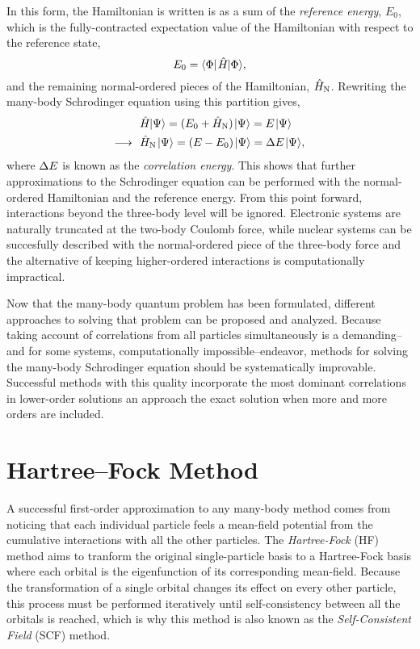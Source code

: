 \documentclass[thesis.tex]{subfiles}
\begin{document}
In this form, the Hamiltonian is written is as a sum of the \textit{reference energy}, $E_{0}$, which is the fully-contracted expectation value of the Hamiltonian with respect to the reference state,
\begin{equation}
  E_{0} = \element{\Phi}{\Ham}{\Phi},
\end{equation}
and the remaining normal-ordered pieces of the Hamiltonian, $\hat{H}_{\mathrm{N}}$.  Rewriting the many-body Schrodinger equation using this partition gives,
\begin{align}
  &\Ham\ket{\Psi} = (E_{0} + \HamN)\ket{\Psi} = E\ket{\Psi} \notag \\
  \longrightarrow\ \ &\HamN\ket{\Psi} = (E - E_{0})\ket{\Psi} = \Ecorr\ket{\Psi},
\end{align}
where $\Delta E$ is known as the \textit{correlation energy}.  This shows that further approximations to the Schrodinger equation can be performed with the normal-ordered Hamiltonian and the reference energy.  From this point forward, interactions beyond the three-body level will be ignored.  Electronic systems are naturally truncated at the two-body Coulomb force, while nuclear systems can be succesfully described with the normal-ordered piece of the three-body force and the alternative of keeping higher-ordered interactions is computationally impractical.

Now that the many-body quantum problem has been formulated, different approaches to solving that problem can be proposed and analyzed.  Because taking account of correlations from all particles simultaneously is a demanding--and for some systems, computationally impossible--endeavor, methods for solving the many-body Schrodinger equation should be systematically improvable. Successful methods with this quality incorporate the most dominant correlations in lower-order solutions an approach the exact solution when more and more orders are included.

\section{Hartree--Fock Method}
A successful first-order approximation to any many-body method comes from noticing that each individual particle feels a mean-field potential from the cumulative interactions with all the other particles.  The \textit{Hartree-Fock} (HF) method aims to tranform the original single-particle basis to a Hartree-Fock basis where each orbital is the eigenfunction of its corresponding mean-field.  Because the transformation of a single orbital changes its effect on every other particle, this process must be performed iteratively until self-consistency between all the orbitals is reached, which is why this method is also known as the \textit{Self-Consistent Field} (SCF) method.
\end{document}
